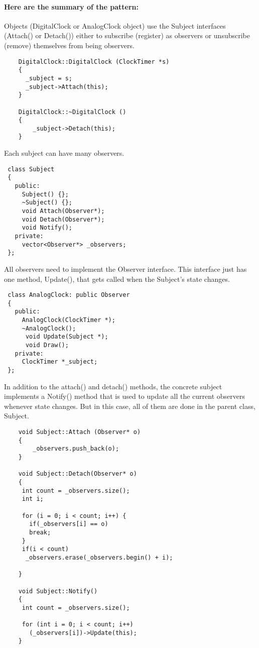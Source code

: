 \documentclass{book}
\begin{document}
\paragraph{Here are the summary of the pattern:}
    Objects (DigitalClock or AnalogClock object) use the Subject interfaces (Attach() or Detach()) either to subscribe (register) as observers or
    unsubscribe (remove) themselves from being observers.
\begin{verbatim}
    DigitalClock::DigitalClock (ClockTimer *s) 
    { 
      _subject = s; 
      _subject->Attach(this); 
    } 

    DigitalClock::~DigitalClock () 
    { 
        _subject->Detach(this); 
    } 
\end{verbatim}
    Each subject can have many observers.
\begin{verbatim}
 class Subject 
 { 
   public: 
     Subject() {}; 
     ~Subject() {}; 
     void Attach(Observer*); 
     void Detach(Observer*); 
     void Notify(); 
   private: 
     vector<Observer*> _observers; 
 }; 
\end{verbatim}
    All observers need to implement the Observer interface. This interface just has one method, Update(), that gets called when the Subject's state changes.
\begin{verbatim}
 class AnalogClock: public Observer 
 { 
   public: 
     AnalogClock(ClockTimer *);  
     ~AnalogClock();    
      void Update(Subject *);  
      void Draw();     
   private: 
     ClockTimer *_subject;   
 };
\end{verbatim}
    In addition to the attach() and detach() methods, the concrete subject implements a Notify() method that is used to update all the current observers whenever state changes.
    But in this case, all of them are done in the parent class, Subject.
\begin{verbatim}
    void Subject::Attach (Observer* o) 
    { 
        _observers.push_back(o); 
    } 

    void Subject::Detach(Observer* o) 
    { 
     int count = _observers.size(); 
     int i; 

     for (i = 0; i < count; i++) { 
       if(_observers[i] == o) 
       break; 
     } 
     if(i < count) 
      _observers.erase(_observers.begin() + i); 

    } 

    void Subject::Notify() 
    { 
     int count = _observers.size(); 

     for (int i = 0; i < count; i++) 
       (_observers[i])->Update(this); 
    }
\end{verbatim}
\end{document}
